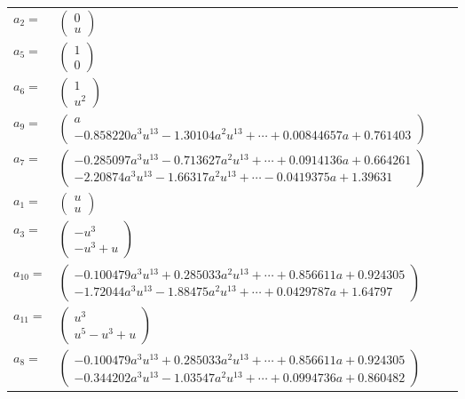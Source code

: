 \documentclass[1p]{elsarticle_modified}
\theoremstyle{definition}
\begin{document}
\begin{tabular}{m{7pt} m{180pt} m{7pt} m{180pt} }
\flushright $a_{2}=$&$\begin{pmatrix}0\\u\end{pmatrix}$ \\
\flushright $a_{5}=$&$\begin{pmatrix}1\\0\end{pmatrix}$ \\
\flushright $a_{6}=$&$\begin{pmatrix}1\\u^2\end{pmatrix}$ \\
\flushright $a_{9}=$&$\begin{pmatrix}a\\-0.858220 a^{3} u^{13}-1.30104 a^{2} u^{13}+\cdots+0.00844657 a+0.761403\end{pmatrix}$ \\
\flushright $a_{7}=$&$\begin{pmatrix}-0.285097 a^{3} u^{13}-0.713627 a^{2} u^{13}+\cdots+0.0914136 a+0.664261\\-2.20874 a^{3} u^{13}-1.66317 a^{2} u^{13}+\cdots-0.0419375 a+1.39631\end{pmatrix}$ \\
\flushright $a_{1}=$&$\begin{pmatrix}u\\u\end{pmatrix}$ \\
\flushright $a_{3}=$&$\begin{pmatrix}- u^3\\- u^3+u\end{pmatrix}$ \\
\flushright $a_{10}=$&$\begin{pmatrix}-0.100479 a^{3} u^{13}+0.285033 a^{2} u^{13}+\cdots+0.856611 a+0.924305\\-1.72044 a^{3} u^{13}-1.88475 a^{2} u^{13}+\cdots+0.0429787 a+1.64797\end{pmatrix}$ \\
\flushright $a_{11}=$&$\begin{pmatrix}u^3\\u^5- u^3+u\end{pmatrix}$ \\
\flushright $a_{8}=$&$\begin{pmatrix}-0.100479 a^{3} u^{13}+0.285033 a^{2} u^{13}+\cdots+0.856611 a+0.924305\\-0.344202 a^{3} u^{13}-1.03547 a^{2} u^{13}+\cdots+0.0994736 a+0.860482\end{pmatrix}$ \\

\end{tabular}
\end{document}

